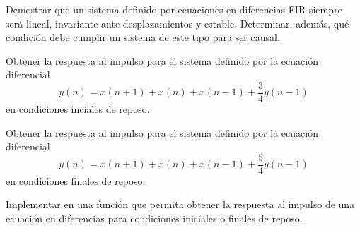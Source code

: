     \begin{ejercicio}
    Demostrar que un sistema definido por ecuaciones en diferencias FIR siempre será lineal, invariante ante desplazamientos y estable. Determinar, además, qué condición debe cumplir un sistema de este tipo para ser causal.
    \end{ejercicio}
    
    \begin{ejercicio}
    Obtener la respuesta al impulso para el sistema definido por la ecuación diferencial 
    \begin{equation*}
        y(n) = x(n+1) + x(n) + x(n-1) + \frac{3}{4} y(n-1)
    \end{equation*}
    en condiciones inciales de reposo. \end{ejercicio}
    
    \begin{ejercicio}
    Obtener la respuesta al impulso para el sistema definido por la ecuación diferencial 
    \begin{equation*}
        y(n) = x(n+1) + x(n) + x(n-1) + \frac{5}{4} y(n-1)
    \end{equation*}
    en condiciones finales de reposo. \end{ejercicio}
    
    \begin{ejercicio}
    Implementar en \Keyboardsym una función que permita obtener la respuesta al impulso de una ecuación en diferencias para condiciones iniciales o finales de reposo.
    \end{ejercicio}
    
    
    